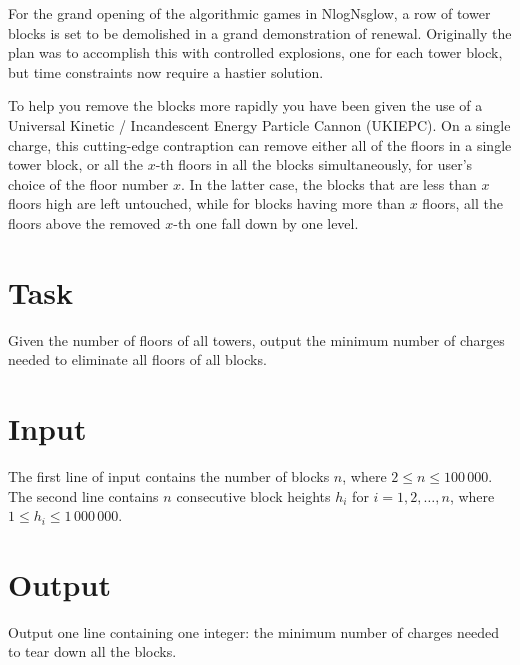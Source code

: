 

For the grand opening of the algorithmic games in NlogNsglow, a row of tower blocks is set to be demolished in a grand demonstration of renewal. Originally the plan was to accomplish this with controlled explosions, one for each tower block, but time constraints now require a hastier solution.

To help you remove the blocks more rapidly you have been given the use of a Universal Kinetic / Incandescent Energy Particle Cannon (UKIEPC). On a single charge, this cutting-edge contraption can remove either all of the floors in a single tower block, or all the $x$-th floors in all the blocks simultaneously, for user's choice of the floor number $x$. In the latter case, the blocks that are less than $x$ floors high are left untouched, while for blocks having more than $x$ floors, all the floors above the removed $x$-th one fall down by one level.

\section*{Task}

Given the number of floors of all towers, output the minimum number of charges needed to eliminate all floors of all blocks.

\section*{Input}

The first line of input contains the number of blocks $n$, where $2 \leq n \leq 100\, 000$. The second line contains $n$ consecutive block heights $h_i$ for $i=1,2,\ldots,n$, where $1 \leq h_i \leq 1\, 000\, 000$.

\section*{Output}

Output one line containing one integer: the minimum number of charges needed to tear down all the blocks.
